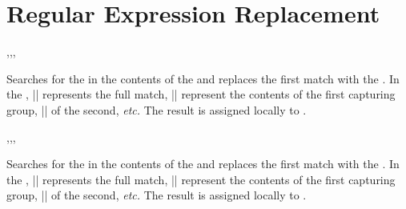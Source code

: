 \documentclass[oneside]{book}
\begin{document}
\section{Regular Expression Replacement}

\begin{function}{\RegexReplaceOnce,\RegexReplaceOnceT,\RegexReplaceOnceT,\RegexReplaceOnceTF}
\begin{syntax}
   
    
    
     
\end{syntax}
Searches for the  in the contents of the
 and replaces the first match with the
. In the ,
|\0| represents the full match, |\1| represent the contents of the
first capturing group, |\2| of the second, \emph{etc.}
The result is assigned locally to .
\end{function}

\begin{function}{\RegexReplaceOnce,\RegexReplaceOnceT,\RegexReplaceOnceT,\RegexReplaceOnceTF}
\begin{syntax}
   
    
    
     
\end{syntax}
Searches for the  in the contents of the
 and replaces the first match with the
. In the ,
|\0| represents the full match, |\1| represent the contents of the
first capturing group, |\2| of the second, \emph{etc.}
The result is assigned locally to .
\end{function}
\end{document}
